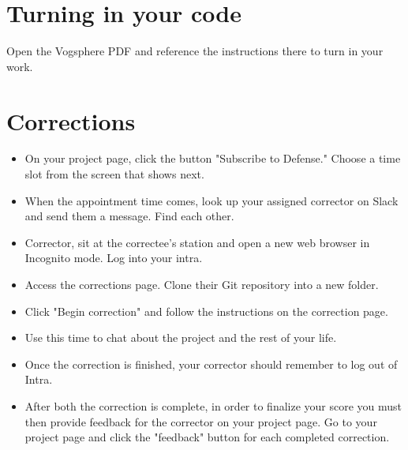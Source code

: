 \documentclass{42-en}
\begin{document}
\chapter{Turning in your code}

Open the Vogsphere PDF and reference the instructions there to turn in your work.


\chapter{Corrections}
\begin{itemize}
	\item On your project page, click the button "Subscribe to Defense." Choose a time slot from the screen that shows next.

	\item When the appointment time comes, look up your assigned corrector on Slack and send them a message. Find each other.

	\item Corrector, sit at the correctee's station and open a new web browser in Incognito mode. Log into your intra.

	\item Access the corrections page. Clone their Git repository into a new folder.

	\item Click "Begin correction" and follow the instructions on the correction page.

	\item Use this time to chat about the project and the rest of your life.

	\item Once the correction is finished, your corrector should remember to log out of Intra.

	\item After both the correction is complete, in order to finalize your score you must then provide feedback for the corrector on your project page. Go to your project page and click the "feedback" button for each completed correction.

\end{itemize}

\end{document}
